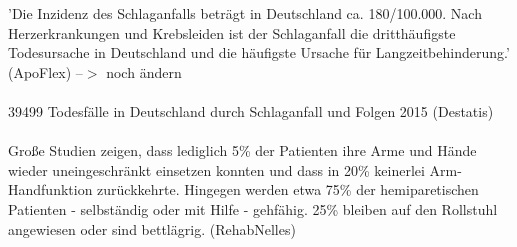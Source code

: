 'Die Inzidenz des Schlaganfalls beträgt in Deutschland ca. 180/100.000. Nach Herzerkrankungen und Krebsleiden ist der Schlaganfall die dritthäufigste Todesursache in Deutschland und die häufigste Ursache für Langzeitbehinderung.' (ApoFlex) --$>$ noch ändern \\ \\
39499 Todesfälle in Deutschland durch Schlaganfall und Folgen 2015 (Destatis) \\ \\
Große Studien zeigen, dass lediglich 5\% der Patienten ihre Arme und Hände wieder uneingeschränkt einsetzen konnten und dass in 20\% keinerlei Arm-Handfunktion zurückkehrte. Hingegen werden etwa 75\% der hemiparetischen Patienten - selbständig oder mit Hilfe - gehfähig. 25\% bleiben auf den Rollstuhl angewiesen oder sind bettlägrig. (RehabNelles)